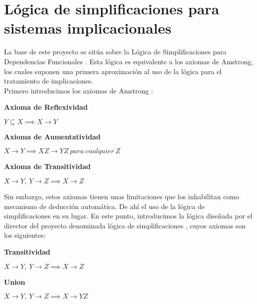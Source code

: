 \section{L\'ogica de simplificaciones para sistemas implicacionales}


La base de este proyecto se sit\'ua sobre la L\'ogica de Simplificaciones para Dependencias Funcionales \cite{Cordero2002}. Esta l\'ogica es equivalente a los axiomas de Amstrong, los cuales suponen una primera aproximaci\'on al uso de la l\'ogica para el tratamiento de implicaciones.\\

Primero introducimos los axiomas de Amstrong \cite{Armstrong1974DependencySO}:

\textbf{Axioma de Reflexividad}

\begin{center}
    \(Y \subseteq X \implies X \to Y \)
\end{center}

\textbf{Axioma de Aumentatividad}

\begin{center}
    \(X \to Y \implies XZ \to YZ \ para \ cualquier \ Z \)
\end{center}

\textbf{Axioma de Transitividad}

\begin{center}
    \(X \to Y, \ Y \to Z \implies X \to Z \)
\end{center}

Sin embargo, estos axiomas tienen unas limitaciones que los inhabilitan como mecanismo de deducci\'on autom\'atica. De ah\'i el uso de la l\'ogica de simplificaciones en su lugar. En este punto, introducimos la l\'ogica dise\~nada por el director del proyecto denominada l\'ogica de simplificaciones \cite{Cordero2002}, cuyos axiomas son los siguientes:

\textbf{Transitividad}

\begin{center}
    \(X \to Y, \ Y \to Z \implies X \to Z \)
\end{center}

\textbf{Union}

\begin{center}
    \(X \to Y, \ Y \to Z \implies X \to YZ \)
\end{center}

